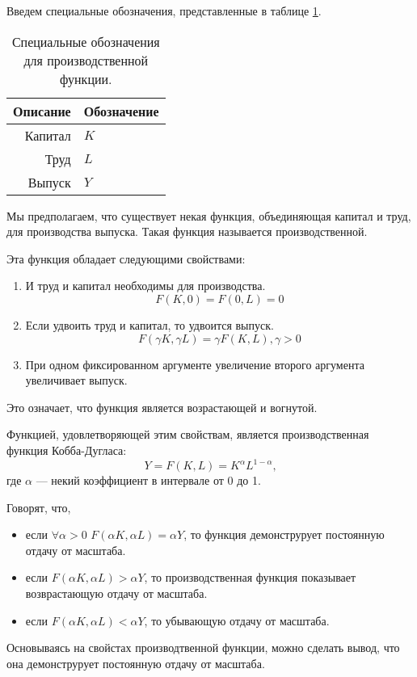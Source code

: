 Введем специальные обозначения, представленные в таблице \ref{tab:prod_func}.
\begin{table}[ht]
	\centering
	\caption{Специальные обозначения для производственной функции.}
	\begin{tabular}{|r|l|}
		\hline
		Описание & Обозначение \\ \hline
		Капитал  &      $K$    \\
		Труд     &      $L$    \\
		Выпуск   &      $Y$    \\ \hline
		\end{tabular}%
	\label{tab:prod_func}
\end{table}
Мы предполагаем, что существует некая функция, объединяющая капитал и труд, для производства выпуска.
Такая функция называется производственной.

Эта функция обладает следующими свойствами:
\begin{enumerate}
	\item И труд и капитал необходимы для производства.
	\[
		F(K, 0) = F(0, L) = 0
	\]
	\item Если удвоить труд и капитал, то удвоится выпуск.
	\[
		F(\gamma K, \gamma L) = \gamma F(K, L), \gamma > 0
	\]
	\item При одном фиксированном аргументе увеличение второго аргумента увеличивает выпуск.
\end{enumerate}
Это означает, что функция является возрастающей и вогнутой.

Функцией, удовлетворяющей этим свойствам, является производственная функция Кобба-Дугласа:
\begin{equation}
	Y = F(K, L) = K^{\alpha}L^{1-\alpha}\text{,}
\label{F:Cob_Duglas}
\end{equation}
где $\alpha$ --- некий коэффициент в интервале от 0 до 1.

Говорят, что,
\begin{itemize}
\item если $\forall \alpha>0$ $F(\alpha K, \alpha L) = \alpha Y$, то функция демонструрует постоянную отдачу от масштаба.
\item если $F(\alpha K, \alpha L) > \alpha Y$, то производственная функция показывает возврастающую отдачу от масштаба.
\item если $F(\alpha K, \alpha L) < \alpha Y$, то убывающую отдачу от масштаба.
\end{itemize}
Основываясь на свойстах производтвенной функции, можно сделать вывод, что она демонструрует постоянную отдачу от масштаба.


